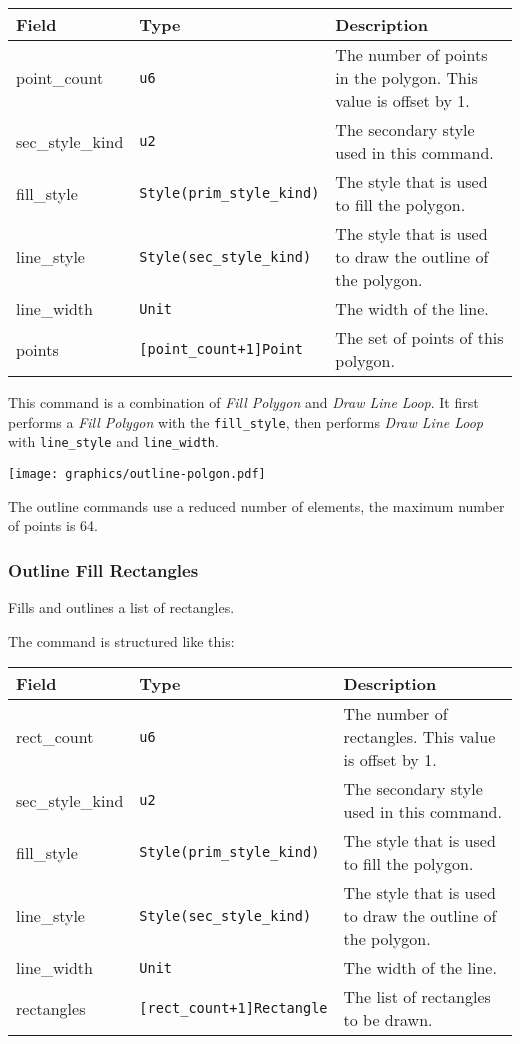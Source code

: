 \documentclass[]{article}
\begin{document}
\begin{longtable}[]{@{}p{1in}p{2in}p{3in}@{}}
\toprule
Field & Type & Description \\
\midrule
\endhead
point\_count     & \texttt{u6}                        & The number of points in the polygon. This value is offset by 1. \\
sec\_style\_kind & \texttt{u2}                        & The secondary style used in this command. \\
fill\_style      & \texttt{Style(prim\_style\_kind)}  & The style that is used to fill the polygon. \\
line\_style      & \texttt{Style(sec\_style\_kind)}   & The style that is used to draw the outline of the polygon. \\
line\_width      & \texttt{Unit}                      & The width of the line. \\
points           & \texttt{{[}point\_count+1{]}Point} & The set of points of this polygon. \\
\bottomrule
\end{longtable}

This command is a combination of \emph{Fill Polygon} and \emph{Draw Line Loop}. It first performs a \emph{Fill Polygon} with the \texttt{fill\_style}, then performs \emph{Draw Line Loop} with \texttt{line\_style} and \texttt{line\_width}.

\begin{center}
\texttt{[image: graphics/outline-polgon.pdf]}
\end{center}

The outline commands use a reduced number of elements, the maximum
number of points is 64.

\hypertarget{outline-fill-rectangles}{\subsubsection{Outline Fill Rectangles}\label{outline-fill-rectangles}}

Fills and outlines a list of rectangles.

The command is structured like this:

\begin{longtable}[]{@{}p{1in}p{2.2in}p{2.8in}@{}}
\toprule
Field & Type & Description \\
\midrule
\endhead
rect\_count & \texttt{u6}                                & The number of rectangles. This value is offset by 1. \\
sec\_style\_kind & \texttt{u2}                           & The secondary style used in this command. \\
fill\_style      & \texttt{Style(prim\_style\_kind)}     & The style that is used to fill the polygon. \\
line\_style      & \texttt{Style(sec\_style\_kind)}      & The style that is used to draw the outline of the polygon. \\
line\_width      & \texttt{Unit}                         & The width of the line. \\
rectangles       & \texttt{{[}rect\_count+1{]}Rectangle} & The list of rectangles to be drawn. \\
\bottomrule
\end{longtable}
\end{document}
